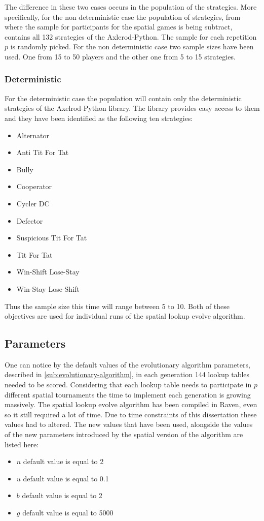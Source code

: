 The difference in these two cases occurs in the population of the strategies.
More specifically, for the non deterministic case
the population of strategies, from where the sample for participants for
the spatial games is being subtract, contains all 132 strategies of the
Axlerod-Python. The sample for each repetition \(p\) is randomly picked. For the
non deterministic case two sample sizes have been used. One from
15 to 50 players and the other one from 5 to 15 strategies.

\subsubsection{Deterministic}

For the deterministic case the population will contain only
the deterministic strategies of the Axelrod-Python library. The library provides
easy access to them and they have been identified as the following ten strategies:
\begin{itemize}
   \item Alternator
   \item Anti Tit For Tat
   \item Bully
   \item Cooperator
   \item Cycler DC
   \item Defector
   \item Suspicious Tit For Tat
   \item Tit For Tat
   \item Win-Shift Lose-Stay
   \item Win-Stay Lose-Shift
\end{itemize}

Thus the sample size this time will range between 5 to 10. Both of these
objectives are used for individual runs of the spatial lookup evolve algorithm.

\subsection{Parameters}

One can notice by the default values of the evolutionary algorithm parameters,
described in \autoref{sub:evolutionary-algorithm}, in each generation
144 lookup tables needed to be scored. Considering that each lookup table needs
to participate in \(p\) different spatial tournaments the time to implement
each generation is growing massively. The spatial lookup evolve algorithm
has been compiled in Raven, even so it still required a lot of time. Due to time
constraints of this dissertation these values had to altered. The new values
that have been used, alongside the values of the new parameters introduced
by the spatial version of the algorithm are listed here:
\begin{itemize}
    \item \(n\) default value is equal to 2
    \item \(u\) default value is equal to 0.1
    \item \(b\) default value is equal to 2
    \item \(g\) default value is equal to 5000
\end{itemize}

